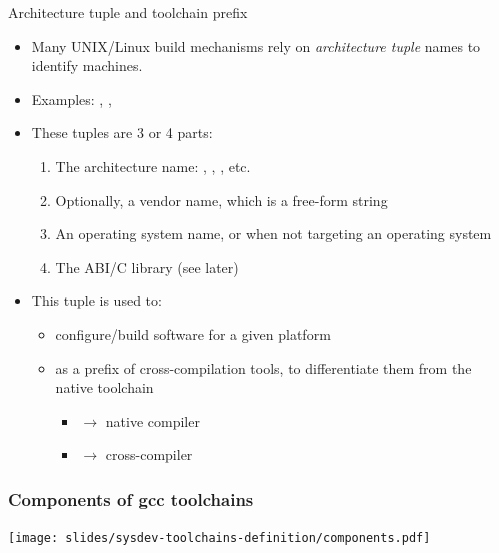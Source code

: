 \begin{frame}{Architecture tuple and toolchain prefix}
  \begin{itemize}
  \item Many UNIX/Linux build mechanisms rely on {\em architecture
      tuple} names to identify machines.
  \item Examples: ,
    , 
  \item These tuples are 3 or 4 parts:
    \begin{enumerate}
    \item The architecture name: , ,
      , etc.
    \item Optionally, a vendor name, which is a free-form string
    \item An operating system name, or  when not targeting
      an operating system
    \item The ABI/C library (see later)
    \end{enumerate}
  \item This tuple is used to:
    \begin{itemize}
    \item configure/build software for a given platform
    \item as a prefix of cross-compilation tools, to differentiate
      them from the native toolchain
      \begin{itemize}
      \item {} $\rightarrow$ native compiler
      \item {} $\rightarrow$ cross-compiler
      \end{itemize}
    \end{itemize}
  \end{itemize}
\end{frame}

\begin{frame}
  \frametitle{Components of gcc toolchains}
  \begin{center}
    \texttt{[image: slides/sysdev-toolchains-definition/components.pdf]}
  \end{center}
\end{frame}


